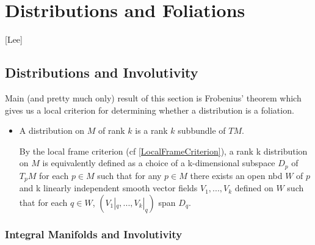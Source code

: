 \documentclass{report}
\theoremstyle{definition}
\begin{document}
\chapter{Distributions and Foliations}

[Lee]

\section{Distributions and Involutivity}

Main (and pretty much only) result of this section is Frobenius' theorem which gives us a local criterion for determining whether a distribution is a foliation.

\begin{itemize}
    \item A distribution on $M$ of rank $k$ is a rank $k$ subbundle of $TM$.

    By the local frame criterion (cf \ref{LocalFrameCriterion}), a rank k distribution on $M$ is equivalently defined as a choice of a k-dimensional subspace $D_p$ of $T_pM$ for each $p\in M$ such that for any $p\in M$ there exists an open nbd $W$ of $p$ and k linearly independent smooth vector fields $V_1,...,V_k$ defined on $W$ such that for each $q\in W$, $(V_1|_q,...,V_k|_q)$ span $D_q$.
\end{itemize}

\subsection{Integral Manifolds and Involutivity}
\end{document}
